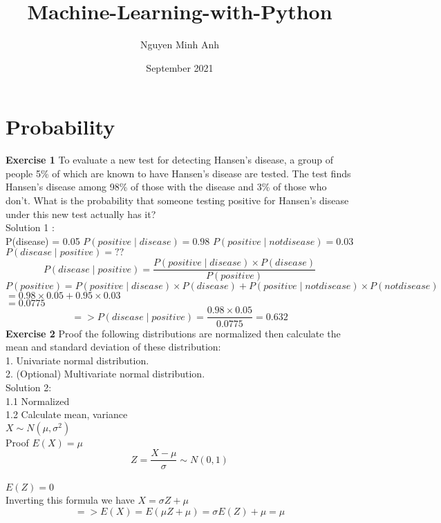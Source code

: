 \documentclass{article}
\title{Machine-Learning-with-Python}
\author{Nguyen Minh Anh}
\date{September 2021}
\begin{document}
\maketitle

\section{Probability}

\textbf{Exercise 1}
To evaluate a new test for detecting Hansen’s disease, a group of people 5\% of which are known to have Hansen’s disease are tested. The test finds Hansen’s disease among 98\% of those with the disease and 3\% of those who don’t. What is the probability that someone testing positive for Hansen’s disease under this new test actually has it? \\
Solution 1 : \\
P(disease) = 0.05 \newline
$P(positive \mid disease) = 0.98$ \newline
$P(positive \mid not disease) = 0.03$ \newline
$P(disease \mid positive) = ??$ \\
$$ P(disease \mid positive) = \frac{P(positive \mid disease) \times P(disease)}{P(positive)} $$
$P(positive) =  P(positive \mid disease) \times P(disease) + P(positive \mid not disease) \times P(not disease)$ \\
$            = 0.98 \times 0.05 + 0.95 \times 0.03$ \\
$            = 0.0775$
$$ => P(disease \mid positive) = \frac{0.98 \times 0.05}{0.0775} = 0.632$$
\textbf{Exercise 2} Proof the following distributions are normalized then calculate the mean and standard deviation of these distribution:\\
1. Univariate normal distribution.\\
2. (Optional) Multivariate normal distribution.\\
Solution 2: \\
1.1 Normalized \\
1.2 Calculate mean, variance \\
$X \sim N(\mu, \sigma^2)$\\ 
Proof $E(X) = \mu$ \\
$$ Z = \frac{X - \mu}{\sigma} \sim N(0,1)$$\\
$E(Z) = 0$\\
Inverting this formula we have $X = \sigma Z + \mu$\\
$$=> E(X) = E(\mu Z + \mu) = \sigma E(Z) + \mu = \mu$$\\
\end{document}
